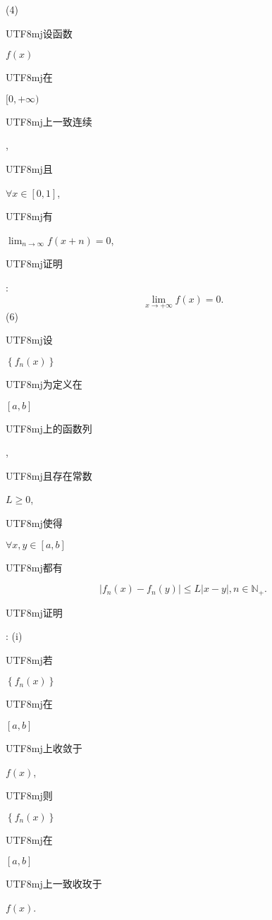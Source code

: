 \documentclass[10pt]{article}
\begin{document}
(4) \begin{CJK}{UTF8}{mj}设函数\end{CJK} $f(x)$ \begin{CJK}{UTF8}{mj}在\end{CJK} $[0,+\infty)$ \begin{CJK}{UTF8}{mj}上一致连续\end{CJK}, \begin{CJK}{UTF8}{mj}且\end{CJK} $\forall x \in[0,1]$, \begin{CJK}{UTF8}{mj}有\end{CJK} $\lim _{n \rightarrow \infty} f(x+n)=0$, \begin{CJK}{UTF8}{mj}证明\end{CJK}:
$$
\lim _{x \rightarrow+\infty} f(x)=0 .
$$
(6) \begin{CJK}{UTF8}{mj}设\end{CJK} $\left\{f_{n}(x)\right\}$ \begin{CJK}{UTF8}{mj}为定义在\end{CJK} $[a, b]$ \begin{CJK}{UTF8}{mj}上的函数列\end{CJK}, \begin{CJK}{UTF8}{mj}且存在常数\end{CJK} $L \geq 0$, \begin{CJK}{UTF8}{mj}使得\end{CJK} $\forall x, y \in[a, b]$ \begin{CJK}{UTF8}{mj}都有\end{CJK}
$$
\left|f_{n}(x)-f_{n}(y)\right| \leq L|x-y|, n \in \mathbb{N}_{+} .
$$
\begin{CJK}{UTF8}{mj}证明\end{CJK}: (i) \begin{CJK}{UTF8}{mj}若\end{CJK} $\left\{f_{n}(x)\right\}$ \begin{CJK}{UTF8}{mj}在\end{CJK} $[a, b]$ \begin{CJK}{UTF8}{mj}上收敛于\end{CJK} $f(x)$, \begin{CJK}{UTF8}{mj}则\end{CJK} $\left\{f_{n}(x)\right\}$ \begin{CJK}{UTF8}{mj}在\end{CJK} $[a, b]$ \begin{CJK}{UTF8}{mj}上一致收玫于\end{CJK} $f(x)$.
\end{document}

